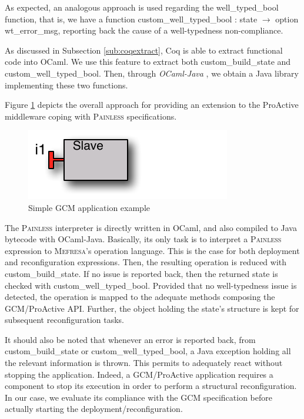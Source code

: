 	As expected, an analogous approach is used regarding the \textsf{well\_typed\_bool} function,
	that is, we have a function \textsf{custom_well_typed_bool : state $\rightarrow$ option wt_error_msg},
	reporting back the cause of a well-typedness non-compliance.
	

	As discussed in Subsection \ref{sub:coqextract}, Coq is able to extract functional code
	into OCaml. We use this feature to extract both \textsf{custom\_build\_state} and 
	\textsf{custom\_well\_typed\_bool}. Then, through \textit{OCaml-Java} \cite{conf/sfp/Clerc12}, 
	we obtain a Java library implementing these two functions. 
	
	Figure \ref{fig:integration} depicts the overall approach for providing an
	extension to the ProActive middleware coping with \textsc{Painless} specifications.
						
					
	\begin{figure}[H]
	\centering
	 \includegraphics[scale=1]{figures/chapter5/starter.pdf} 	
   	\caption{Simple GCM application example}
   	\label{fig:integration}
	\end{figure}
	
	
	\noindent The \textsc{Painless} interpreter is directly written in OCaml, and also
	compiled to Java bytecode with OCaml-Java. 	
	Basically, its only task is to interpret a \textsc{Painless} expression to 
	\textsc{Mefresa}'s \textsf{operation} language. This is the case for both
	deployment and reconfiguration expressions.	
	Then, the resulting
	\textsf{operation} is reduced with \textsf{custom\_build\_state}. If
	no issue is reported back, then the returned \textsf{state} is checked
	with \textsf{custom\_well\_typed\_bool}. Provided that no well-typedness
	issue is detected, the \textsf{operation} is mapped to the adequate methods	
	composing the GCM/ProActive API. Further, the object holding the
	\textsf{state}'s structure is kept for subsequent reconfiguration
	tasks.
		
		It should also be noted that whenever an error is reported back,
	from \textsf{custom\_build\_state} or \textsf{custom\_well\_typed\_bool},
	a Java exception holding all the relevant information is thrown. This
	permits to adequately react without stopping the application. Indeed,
	a GCM/ProActive application requires a component 
	to stop its execution in order to perform
	a structural reconfiguration. In our case, we evaluate
	its compliance with the \ac{GCM} specification before actually
	starting the deployment/reconfiguration.
		
